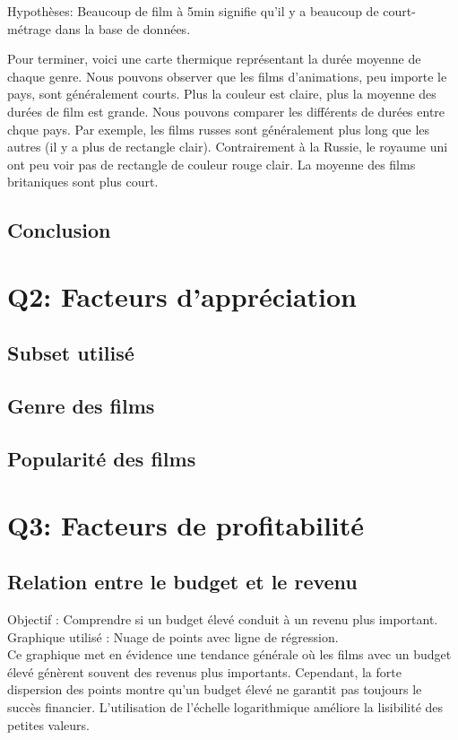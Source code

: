 \documentclass{article}
\begin{document}

Hypothèses: Beaucoup de film à 5min signifie qu’il y a beaucoup de court-métrage dans la base de données.


Pour terminer, voici une carte thermique représentant la durée moyenne de chaque genre. Nous pouvons observer que les films d’animations, peu importe le pays, sont généralement courts. Plus la couleur est claire, plus la moyenne des durées de film est grande. Nous pouvons comparer les différents de durées entre chque pays. Par exemple, les films russes sont généralement plus long que les autres (il y a plus de rectangle clair). Contrairement à la Russie, le royaume uni ont peu voir pas de rectangle de couleur rouge clair. La moyenne des films britaniques sont plus court.

\subsection*{Conclusion}

\section*{Q2: Facteurs d'appréciation}
\subsection*{Subset utilisé}
\subsection*{Genre des films}
\subsection*{Popularité des films}

\section*{Q3: Facteurs de profitabilité}
\subsection*{Relation entre le budget et le revenu}
Objectif : Comprendre si un budget élevé conduit à un revenu plus important.
Graphique utilisé : Nuage de points avec ligne de régression. \\
Ce graphique met en évidence une tendance générale où les films avec un budget élevé génèrent souvent des revenus plus importants. Cependant, la forte dispersion des points montre qu’un budget élevé ne garantit pas toujours le succès financier. L’utilisation de l’échelle logarithmique améliore la lisibilité des petites valeurs.
\end{document}
